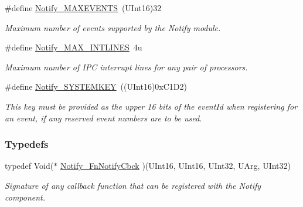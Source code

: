 \begin{DoxyCompactItemize}
\#define \hyperlink{_notify_8h_afb698e2a48abcb1b698e80a16b38bf43}{Notify\-\_\-\-M\-A\-X\-E\-V\-E\-N\-T\-S}~(U\-Int16)32
\begin{DoxyCompactList}\small\item\em Maximum number of events supported by the Notify module. \end{DoxyCompactList}\item 
\#define \hyperlink{_notify_8h_a67e0ce1661274a428248b143dd41dbfc}{Notify\-\_\-\-M\-A\-X\-\_\-\-I\-N\-T\-L\-I\-N\-E\-S}~4u
\begin{DoxyCompactList}\small\item\em Maximum number of I\-P\-C interrupt lines for any pair of processors. \end{DoxyCompactList}\item 
\#define \hyperlink{_notify_8h_ac33600d8704857ef0afbbee3d4ce6d80}{Notify\-\_\-\-S\-Y\-S\-T\-E\-M\-K\-E\-Y}~((U\-Int16)0x\-C1\-D2)
\begin{DoxyCompactList}\small\item\em This key must be provided as the upper 16 bits of the event\-Id when registering for an event, if any reserved event numbers are to be used. \end{DoxyCompactList}\end{DoxyCompactItemize}
\subsubsection*{Typedefs}
\begin{DoxyCompactItemize}
\item 
typedef Void($\ast$ \hyperlink{_notify_8h_ab362f7571ee3d7f7abaa743914edcd62}{Notify\-\_\-\-Fn\-Notify\-Cbck} )(U\-Int16, U\-Int16, U\-Int32, U\-Arg, U\-Int32)
\begin{DoxyCompactList}\small\item\em Signature of any callback function that can be registered with the Notify component. \end{DoxyCompactList}\end{DoxyCompactItemize}
